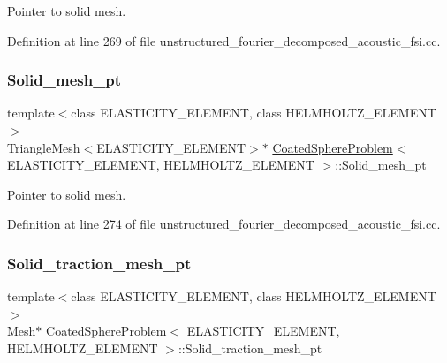 Pointer to solid mesh. 



Definition at line 269 of file unstructured\+\_\+fourier\+\_\+decomposed\+\_\+acoustic\+\_\+fsi.\+cc.

\mbox{\label{classCoatedSphereProblem_a6a1c655fb048aee98669b78024b59e8e}} 
\subsubsection{\texorpdfstring{Solid\+\_\+mesh\+\_\+pt}{Solid\_mesh\_pt}\hspace{0.1cm}{\footnotesize\ttfamily [3/3]}}
{\footnotesize\ttfamily template$<$class E\+L\+A\+S\+T\+I\+C\+I\+T\+Y\+\_\+\+E\+L\+E\+M\+E\+NT, class H\+E\+L\+M\+H\+O\+L\+T\+Z\+\_\+\+E\+L\+E\+M\+E\+NT$>$ \\
Triangle\+Mesh$<$E\+L\+A\+S\+T\+I\+C\+I\+T\+Y\+\_\+\+E\+L\+E\+M\+E\+NT$>$$\ast$ \hyperlink{classCoatedSphereProblem}{Coated\+Sphere\+Problem}$<$ E\+L\+A\+S\+T\+I\+C\+I\+T\+Y\+\_\+\+E\+L\+E\+M\+E\+NT, H\+E\+L\+M\+H\+O\+L\+T\+Z\+\_\+\+E\+L\+E\+M\+E\+NT $>$\+::Solid\+\_\+mesh\+\_\+pt\hspace{0.3cm}{\ttfamily [private]}}



Pointer to solid mesh. 



Definition at line 274 of file unstructured\+\_\+fourier\+\_\+decomposed\+\_\+acoustic\+\_\+fsi.\+cc.

\mbox{\label{classCoatedSphereProblem_aa51300e92727226f4b150eac2c62ddd7}} 
\subsubsection{\texorpdfstring{Solid\+\_\+traction\+\_\+mesh\+\_\+pt}{Solid\_traction\_mesh\_pt}}
{\footnotesize\ttfamily template$<$class E\+L\+A\+S\+T\+I\+C\+I\+T\+Y\+\_\+\+E\+L\+E\+M\+E\+NT, class H\+E\+L\+M\+H\+O\+L\+T\+Z\+\_\+\+E\+L\+E\+M\+E\+NT$>$ \\
Mesh$\ast$ \hyperlink{classCoatedSphereProblem}{Coated\+Sphere\+Problem}$<$ E\+L\+A\+S\+T\+I\+C\+I\+T\+Y\+\_\+\+E\+L\+E\+M\+E\+NT, H\+E\+L\+M\+H\+O\+L\+T\+Z\+\_\+\+E\+L\+E\+M\+E\+NT $>$\+::Solid\+\_\+traction\+\_\+mesh\+\_\+pt\hspace{0.3cm}{\ttfamily [private]}}



